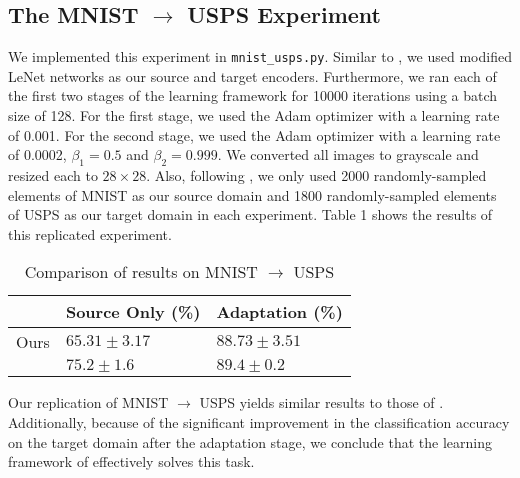 \documentclass[14pt]{extarticle}
\begin{document}
		\subsection{The MNIST $\rightarrow$ USPS Experiment}
		We implemented this experiment in \texttt{mnist\_usps.py}. Similar to \cite{adda}, we used modified LeNet networks as our source and target encoders. Furthermore, we ran each of the first two stages of the learning framework for 10000 iterations using a batch size of 128. For the first stage, we used the Adam optimizer with a learning rate of 0.001. For the second stage, we used the Adam optimizer with a learning rate of 0.0002, $\beta_1 = 0.5$ and $\beta_2 = 0.999$. We converted all images to grayscale and resized each to $28 \times 28$. Also, following \cite{adda}, we only used 2000 randomly-sampled elements of MNIST as our source domain and 1800 randomly-sampled elements of USPS as our target domain in each experiment. Table 1 shows the results of this replicated experiment.
		\begin{table}[H]
			\centering
			\begin{tabular}{|P{40mm}|P{40mm}|P{40mm}|}
				\hline
				 & Source Only (\%) & Adaptation (\%)\\
				\hline
				Ours & $65.31 \pm 3.17$ & $88.73 \pm 3.51$\\
				\hline
				\cite{adda} & $75.2 \pm 1.6$ & $89.4 \pm 0.2$\\
				\hline
			\end{tabular}
			\caption{Comparison of results on MNIST $\rightarrow$ USPS}
		\end{table}
		Our replication of MNIST $\rightarrow$ USPS yields similar results to those of \cite{adda}. Additionally, because of the significant improvement in the classification accuracy on the target domain after the adaptation stage, we conclude that the learning framework of \cite{adda} effectively solves this task.
\end{document}
